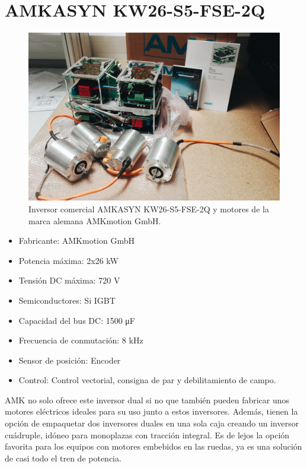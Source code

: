 \section{AMKASYN KW26-S5-FSE-2Q}
\begin{figure}[H]
	\centering
	\includegraphics[width=0.7\linewidth]{fig/amk}
	\caption{Inversor comercial AMKASYN KW26-S5-FSE-2Q y motores de la marca alemana AMKmotion GmbH. \cite{amk_tirol}}
	\label{fig:amk}
\end{figure}

\begin{itemize}
	\item Fabricante: AMKmotion GmbH
	\item Potencia máxima: 2x26 kW
	\item Tensión DC máxima: 720 V
	\item Semiconductores: Si IGBT
	\item Capacidad del bus DC: 1500 \unit{\micro\farad}
	\item Frecuencia de conmutación: 8 kHz
	\item Sensor de posición: Encoder
	\item Control: Control vectorial, consigna de par y debilitamiento de campo.
\end{itemize}

AMK no solo ofrece este inversor dual si no que también pueden fabricar unos motores eléctricos ideales para su uso junto a estos inversores. Además, tienen la opción de empaquetar dos inversores duales en una sola caja creando un inversor cuádruple, idóneo para monoplazas con tracción integral. Es de lejos la opción favorita para los equipos con motores embebidos en las ruedas, ya es una solución de casi todo el tren de potencia.

